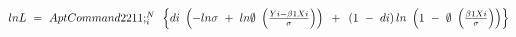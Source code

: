 $lnL{\rm{\ }} = {\rm{\ }}AptCommand2211;_i^N{\rm{\ }}\left\{ {di{\rm{\ }}\left( { - ln\sigma {\rm{\ }} + {\rm{\ }}ln\emptyset {\rm{\ }}\left( {\frac{{Yi - \beta 1Xi}}{\sigma }} \right)} \right){\rm{\ }} + {\rm{\ }}\left( {1{\rm{\ }} - {\rm{\ }}di} \right)ln{\rm{\ }}\left( {1{\rm{\ }} - {\rm{\ }}\emptyset {\rm{\ }}\left( {\frac{{\beta 1Xi}}{\sigma }} \right)} \right)} \right\}$
